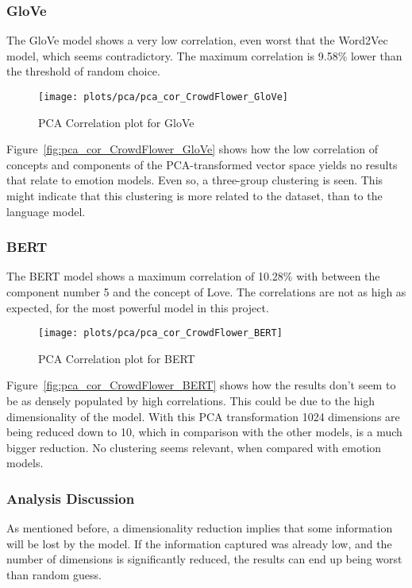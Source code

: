 \subsubsection{GloVe}
The GloVe model shows a very low correlation, even worst that the Word2Vec model, which seems contradictory. The maximum correlation is 9.58\% lower than the threshold of random choice.
\begin{figure}[H]
  \texttt{[image: plots/pca/pca\_cor\_CrowdFlower\_GloVe]}
  \centering
  \caption{PCA Correlation plot for GloVe}
\end{figure}\label{fig:pca_cor_CrowdFlower_GloVe}
Figure~\ref{fig:pca_cor_CrowdFlower_GloVe} shows how the low correlation of concepts and components of the PCA-transformed vector space yields no results that relate to emotion models. Even so, a three-group clustering is seen. This might indicate that this clustering is more related to the dataset, than to the language model.

\subsubsection{BERT}
The BERT model shows a maximum correlation of 10.28\% with between the component number 5 and the concept of Love. The correlations are not as high as expected, for the most powerful model in this project.
\begin{figure}[H]
  \texttt{[image: plots/pca/pca\_cor\_CrowdFlower\_BERT]}
  \centering
  \caption{PCA Correlation plot for BERT}
\end{figure}\label{fig:pca_cor_CrowdFlower_BERT}
Figure~\ref{fig:pca_cor_CrowdFlower_BERT} shows how the results don't seem to be as densely populated by high correlations. This could be due to the high dimensionality of the model. With this PCA transformation 1024 dimensions are being reduced down to 10, which in comparison with the other models, is a much bigger reduction. No clustering seems relevant, when compared with emotion models.

\subsubsection{Analysis Discussion}
As mentioned before, a dimensionality reduction implies that some information will be lost by the model. If the information captured was already low, and the number of dimensions is significantly reduced, the results can end up being worst than random guess.

